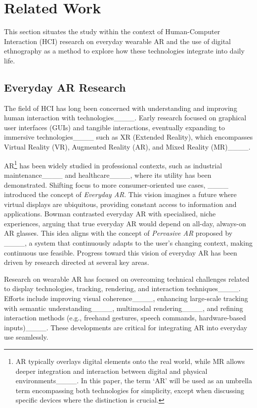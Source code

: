 \section{Related Work}
\sloppy This section situates the study within the context of Human-Computer Interaction (HCI) research on everyday wearable AR and the use of digital ethnography as a method to explore how these technologies integrate into daily life.

\subsection{Everyday AR Research}

The field of HCI has long been concerned with understanding and improving human interaction with technologies____. Early research focused on graphical user interfaces (GUIs) and tangible interactions, eventually expanding to immersive technologies____ such as XR (Extended Reality), which encompasses Virtual Reality (VR), Augmented Reality (AR), and Mixed Reality (MR)____.

AR\footnote{AR typically overlays digital elements onto the real world, while MR allows deeper integration and interaction between digital and physical environments____. In this paper, the term `AR' will be used as an umbrella term encompassing both technologies for simplicity, except when discussing specific devices where the distinction is crucial.} has been widely studied in professional contexts, such as industrial maintenance____ and healthcare____, where its utility has been demonstrated. Shifting focus to more consumer-oriented use cases, ____ introduced the concept of \textit{Everyday AR}. This vision imagines a future where virtual displays are ubiquitous, providing constant access to information and applications. Bowman contrasted everyday AR with specialised, niche experiences, arguing that true everyday AR would depend on all-day, always-on AR glasses. This idea aligns with the concept of \textit{Pervasive AR} proposed by ____,
a system that continuously adapts to the user’s changing context, making continuous use feasible. Progress toward this vision of everyday AR has been driven by research directed at several key areas.

Research on wearable AR has focused on overcoming technical challenges related to display technologies, tracking, rendering, and interaction techniques____. Efforts include improving visual coherence____, enhancing large-scale tracking with semantic understanding____, multimodal rendering____, and refining interaction methods (e.g., freehand gestures, speech commands, hardware-based inputs)____. These developments are critical for integrating AR into everyday use seamlessly.

